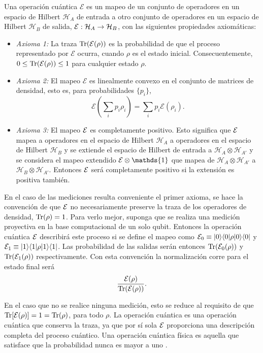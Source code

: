 \begin{definition}\label{DefE(rho)} Una operación cuántica $\mathcal{E}$ es un mapeo de un conjunto de operadores en un espacio de Hilbert $\mathcal{H}_A$ de entrada a otro conjunto de operadores en un espacio de Hilbert $\mathcal{H}_B$ de salida, $\mathcal{E}: \mathcal{H}_A \rightarrow \mathcal{H}_B$, con las siguientes propiedades axiomáticas:

    \begin{itemize}
        \item \textit{Axioma 1:} La traza ${\rm Tr} (\mathcal{E}(\rho))$ es la probabilidad de que el proceso representado por $\mathcal{E}$ ocurra, cuando $\rho$ es el estado inicial. Consecuentemente, $0 \le {\rm Tr} (\mathcal{E}(\rho)) \le 1$ para cualquier estado $\rho$.
        \item \textit{Axioma 2:} El mapeo $\mathcal{E}$ es linealmente convexo en el conjunto de matrices de densidad, esto es, para probabilidades $\{p_i\}$, \[\mathcal{E}\left(\sum _i p_i \rho _i\right)=\sum_i p_i \mathcal{E}(\rho_i).\]
        \item\textit{Axioma 3:} El mapeo $\mathcal{E}$ es completamente positivo. Esto significa que $\mathcal{E}$ mapea a operadores en el espacio de Hilbert $\mathcal{H}_{A}$  a operadores en el espacio de Hilbert $\mathcal{H}_B$ y se extiende el espacio de Hilbert de entrada a $\mathcal{H}_A\otimes\mathcal{H}_{A'}$ y se considera el mapeo extendido $\E \otimes \mathds{1}$ que mapea de $\mathcal{H}_A \otimes \mathcal{H}_{A'} $ a $\mathcal{H}_B \otimes \mathcal{H}_{A'}$. Entonces  $\mathcal{E}$ será completamente positivo si la extensión es positiva también.
    \end{itemize}
\end{definition}

En el caso de las mediciones resulta conveniente el primer axioma, se hace la convención de que $\mathcal{E}$ no necesariamente preserve la traza de los operadores de densidad, ${\rm Tr}(\rho)=1$. Para verlo mejor, suponga que se realiza una medición proyectiva en la base computacional de un solo qubit. Entonces la operación cuántica $\mathcal{E}$ describirá este proceso si se define el mapeo como $\mathcal{E}_0\equiv|0\rangle \langle0|\rho |0\rangle \langle 0|$ y $\mathcal{E}_1\equiv|1\rangle \langle1|\rho |1\rangle \langle 1|$. Las probabilidad de las salidas serán entonces ${\rm Tr} (\mathcal{E}_0(\rho))$ y ${\rm Tr} (\mathcal{E}_1(\rho))$ respectivamente.  Con esta convención la normalización corre para el estado final será \[\dfrac{\mathcal{E}(\rho)}{{\rm Tr} (\mathcal{E} (\rho))}.\]

En el caso que no se realice ninguna medición, esto se reduce al requisito de que ${\rm Tr}[\mathcal{E}(\rho)] = 1 = {\rm Tr}(\rho)$, para todo $\rho$. La operación cuántica es una operación cuántica que conserva la traza, ya que por sí sola $\mathcal{E}$ proporciona una descripción completa del proceso cuántico. Una operación cuántica física es aquella que satisface que la probabilidad nunca es mayor a uno {\cite{nielsen_chuang_2010}}.



